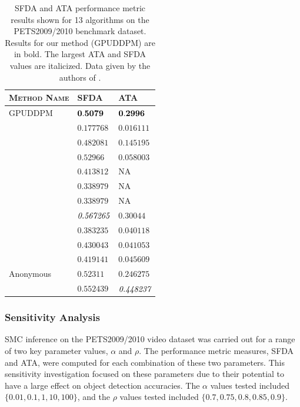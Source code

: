 \documentclass[twocolumn, final]{svjour3}
\begin{document}
\begin{table}
\begin{tabular}[!] {| l | l | l |}
  \hline
  \textsc{Method Name} & \textsc{SFDA}  & \textsc{ATA} \\ \hline \hline
  GPUDDPM & $ \bold{0.5079} $ & $\bold{0.2996}$ \\ \hline
  \cite{arsic2009multi} & $ 0.177768 $ & $0.016111$ \\ \hline
  \cite{berclaz2009multiple} & $ 0.482081 $ & $0.145195$ \\ \hline
  \cite{conte2010performance} & $ 0.52966  $ & $0.058003$ \\ \hline
  \cite{bolme2009simple} & $ 0.413812 $ & NA \\ \hline
  \cite{bolme2009simple} & $ 0.338979 $ & NA \\ \hline
  \cite{bolme2009simple} & $ 0.338979 $ & NA \\ \hline
  \cite{breitenstein2009markovian} & $ \emph{0.567265} $ & $0.30044$ \\ \hline
  \cite{ge2009evaluation} & $ 0.383235 $ & $0.040118$ \\ \hline
  \cite{alahi2009sparsity} & $ 0.430043 $ & $0.041053$ \\ \hline
  \cite{alahi2009sparsity} & $ 0.419141 $ & $0.045609$ \\ \hline
  Anonymous & $ 0.52311  $ & $0.246275$ \\ \hline
  \cite{yang2009probabilistic} & $ 0.552439 $ & $\emph{0.448237}$ \\
  \hline
\end{tabular}
\caption{SFDA and ATA performance metric results shown for 13 algorithms on the PETS2009/2010 benchmark dataset. Results for our method (GPUDDPM) are in bold. The largest ATA and SFDA values are italicized. Data given by the authors of \cite{ellis_2010}.}
\label{benchmark_results_table}
\end{table}



\subsubsection{Sensitivity Analysis}
\label{sec:sensitivityanalysis}

SMC inference on the PETS2009/2010 video dataset was carried out for a range of two key parameter values, $\alpha$ and $\rho$. The performance metric measures, SFDA and ATA, were computed for each combination of these two parameters. This sensitivity investigation focused on these parameters due to their potential to have a large effect on object detection accuracies. The $\alpha$ values tested included $\{ 0.01, 0.1, 1, 10, 100 \}$, and the $\rho$ values tested included $\{ 0.7, 0.75, 0.8, 0.85, 0.9 \}$.
\end{document}
